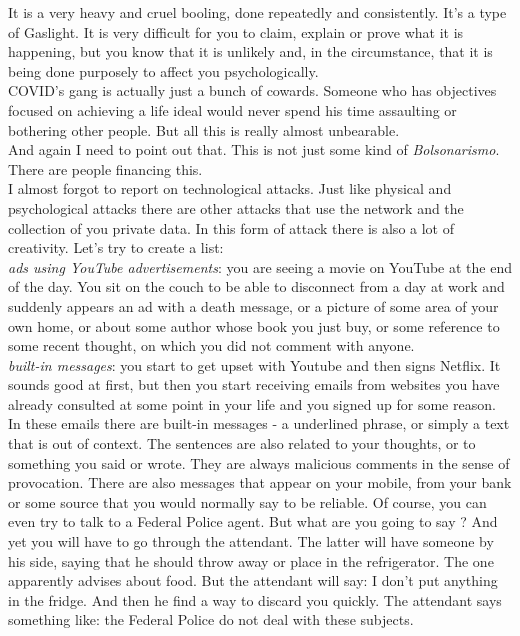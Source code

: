 \documentclass[11pt]{book}
\begin{document}
\noindent It is a very heavy and cruel booling, done repeatedly and consistently. It's a type of Gaslight. It is very difficult for you to claim, explain or prove what it is happening, but you know that it is unlikely and, in the circumstance, that it is being done purposely to affect you psychologically. \\

\noindent COVID's gang is actually just a bunch of cowards. Someone who has objectives focused on achieving a life ideal would never spend his time assaulting or bothering other people. But all this is really almost unbearable. \\

\noindent And again I need to point out that. This is not just some kind of \emph{Bolsonarismo}. There are people financing this. \\

\noindent I almost forgot to report on technological attacks. Just like physical and psychological attacks there are other attacks that use the network and the collection of you private data. In this form of attack there is also a lot of creativity. Let's try to create a list: \\

\emph{ads using YouTube advertisements}: you are seeing a movie on YouTube at the end of the day. You sit on the couch to be able to disconnect from a day at work and suddenly appears an ad with a death message, or a picture of some area of your own home, or about some author whose book you just buy, or some reference to some recent thought, on which you did not comment with anyone. \\

\emph{built-in messages}: you start to get upset with Youtube and then signs Netflix. It sounds good at first, but then you start receiving emails from websites you have already consulted at some point in your life and you signed up for some reason. In these emails there are built-in messages - a underlined phrase, or simply a text that is out of context. The sentences are also related to your thoughts, or to something you said or wrote. They are always malicious comments in the sense of provocation. There are also messages that appear on your mobile, from your bank or some source that you would normally say to be reliable. Of course, you can even try to talk to a Federal Police agent. But what are you going to say ? And yet you will have to go through the attendant. The latter will have someone by his side, saying that he should throw away or place in the refrigerator. The one apparently advises about food. But the attendant will say: I don't put anything in the fridge. And then he find a way to discard you quickly. The attendant says something like: the Federal Police do not deal with these subjects. \\
 
\end{document}
